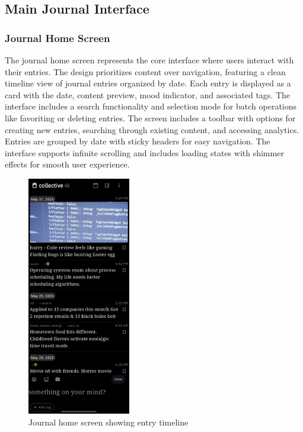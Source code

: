 \subsection{Main Journal Interface}

\subsubsection{Journal Home Screen}

The journal home screen represents the core interface where users interact with their entries. The design prioritizes content over navigation, featuring a clean timeline view of journal entries organized by date. Each entry is displayed as a card with the date, content preview, mood indicator, and associated tags. The interface includes a search functionality and selection mode for batch operations like favoriting or deleting entries. The screen includes a toolbar with options for creating new entries, searching through existing content, and accessing analytics. Entries are grouped by date with sticky headers for easy navigation. The interface supports infinite scrolling and includes loading states with shimmer effects for smooth user experience.

\begin{figure}[H]
\centering
\includegraphics[width=0.4\textwidth]{files/imgs/prototype/journal_screen.jpeg}
\caption{Journal home screen showing entry timeline}
\label{fig:journal-screen}
\end{figure}

